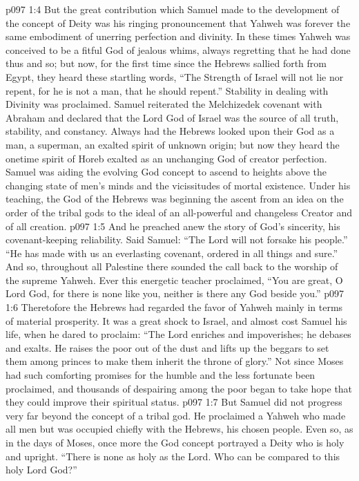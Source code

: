 \vs p097 1:4 But the great contribution which Samuel made to the development of the concept of Deity was his ringing pronouncement that Yahweh was  forever the same embodiment of unerring perfection and divinity. In these times Yahweh was conceived to be a fitful God of jealous whims, always regretting that he had done thus and so; but now, for the first time since the Hebrews sallied forth from Egypt, they heard these startling words, “The Strength of Israel will not lie nor repent, for he is not a man, that he should repent.” Stability in dealing with Divinity was proclaimed. Samuel reiterated the Melchizedek covenant with Abraham and declared that the Lord God of Israel was the source of all truth, stability, and constancy. Always had the Hebrews looked upon their God as a man, a superman, an exalted spirit of unknown origin; but now they heard the onetime spirit of Horeb exalted as an unchanging God of creator perfection. Samuel was aiding the evolving God concept to ascend to heights above the changing state of men’s minds and the vicissitudes of mortal existence. Under his teaching, the God of the Hebrews was beginning the ascent from an idea on the order of the tribal gods to the ideal of an all\hyp{}powerful and changeless Creator and  of all creation.
\vs p097 1:5 And he preached anew the story of God’s sincerity, his covenant\hyp{}keeping reliability. Said Samuel: “The Lord will not forsake his people.” “He has made with us an everlasting covenant, ordered in all things and sure.” And so, throughout all Palestine there sounded the call back to the worship of the supreme Yahweh. Ever this energetic teacher proclaimed, “You are great, O Lord God, for there is none like you, neither is there any God beside you.”
\pc \vs p097 1:6 Theretofore the Hebrews had regarded the favor of Yahweh mainly in terms of material prosperity. It was a great shock to Israel, and almost cost Samuel his life, when he dared to proclaim: “The Lord enriches and impoverishes; he debases and exalts. He raises the poor out of the dust and lifts up the beggars to set them among princes to make them inherit the throne of glory.” Not since Moses had such comforting promises for the humble and the less fortunate been proclaimed, and thousands of despairing among the poor began to take hope that they could improve their spiritual status.\plusone
\vs p097 1:7 But Samuel did not progress very far beyond the concept of a tribal god. He proclaimed a Yahweh who made all men but was occupied chiefly with the Hebrews, his chosen people. Even so, as in the days of Moses, once more the God concept portrayed a Deity who is holy and upright. “There is none as holy as the Lord. Who can be compared to this holy Lord God?”
